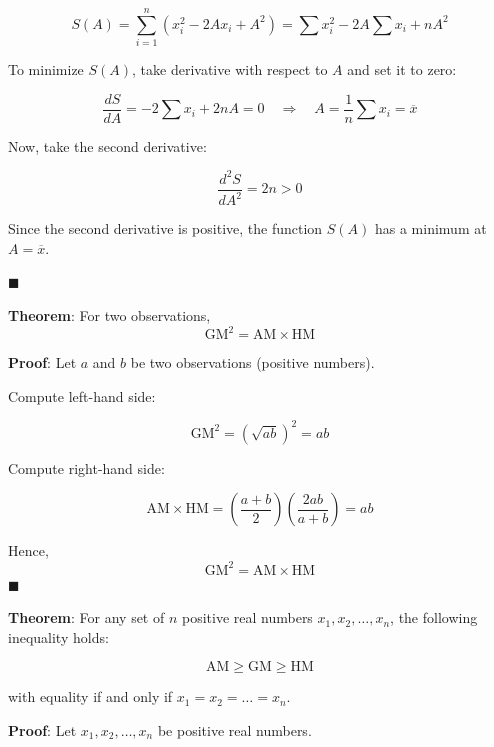 \documentclass[twoside]{book}
\begin{document}
\[
S(A) = \sum_{i=1}^n (x_i^2 - 2Ax_i + A^2) 
= \sum x_i^2 - 2A\sum x_i + nA^2
\]

To minimize \( S(A) \), take derivative with respect to \( A \) and set it to zero:

\[
\frac{dS}{dA} = -2\sum x_i + 2nA = 0 \quad \Rightarrow \quad A = \frac{1}{n} \sum x_i = \overline{x}
\]

Now, take the second derivative:

\[
\frac{d^2S}{dA^2} = 2n > 0
\]

Since the second derivative is positive, the function \( S(A) \) has a minimum at \( A = \overline{x} \).

\hfill $\blacksquare$

\begin{textbox}
\textbf{Theorem}: For two observations, \[ \text{GM}^2 = \text{AM} \times \text{HM} \]
\end{textbox}

\textbf{Proof}: Let \( a \) and \( b \) be two observations (positive numbers).

Compute left-hand side:

\[
\text{GM}^2 = (\sqrt{ab})^2 = ab
\]

Compute right-hand side:

\[
\text{AM} \times \text{HM} = \left( \frac{a + b}{2} \right) \left( \frac{2ab}{a + b} \right) = ab
\]

Hence, \[ \text{GM}^2 = \text{AM} \times \text{HM} \]
\hfill $\blacksquare$

\begin{textbox}
\textbf{Theorem}: For any set of \( n \) positive real numbers \( x_1, x_2, \dots, x_n \), the following inequality holds:

\[
\text{AM} \geq \text{GM} \geq \text{HM}
\]

with equality if and only if \( x_1 = x_2 = \dots = x_n \).
\end{textbox}

\textbf{Proof}: Let \( x_1, x_2, \dots, x_n \) be positive real numbers.
\end{document}

